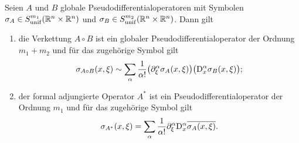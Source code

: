 \begin{thm}
Seien $A$ und $B$ globale Pseudodifferentialoperatoren mit Symbolen $\sigma_A\in S^{m_1}_{\rm unif}(\mathbb R^n\times\mathbb R^n)$ und $\sigma_B\in S^{m_2}_{\rm unif}(\mathbb R^n\times\mathbb R^n)$. Dann gilt
\begin{enumerate}
\item die Verkettung $A\circ B$ ist ein globaler Pseudodifferentialoperator der Ordnung $m_1+m_2$ und für das zugehörige Symbol gilt
\begin{equation}
   \sigma_{A\circ B}(x,\xi) \sim \sum_\alpha \frac1{\alpha!} \big(\partial_\xi^\alpha \sigma_A(x,\xi) \big) \big(\mathrm D_x^\alpha \sigma_B(x,\xi)\big);
\end{equation}
\item der formal adjungierte Operator $A^*$ ist ein Pseudodifferentialoperator der Ordnung $m_1$ und für das zugehörige Symbol gilt
\begin{equation}
   \sigma_{A^*}(x,\xi) = \sum_{\alpha} \frac1{\alpha!} \partial_\xi^\alpha \mathrm D_x^\alpha \overline{\sigma_A(x,\xi)}.
\end{equation}
\end{enumerate}
\end{thm}

